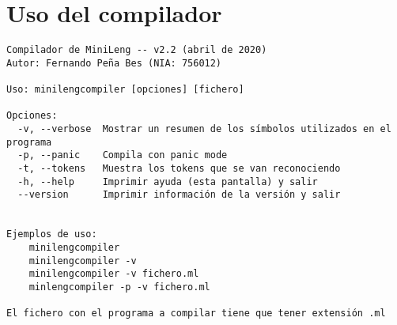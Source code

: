 \documentclass[../main.tex]{subfiles}
\begin{document}
\section{Uso del compilador}

\begin{verbatim}
Compilador de MiniLeng -- v2.2 (abril de 2020)
Autor: Fernando Peña Bes (NIA: 756012)

Uso: minilengcompiler [opciones] [fichero]

Opciones:
  -v, --verbose  Mostrar un resumen de los símbolos utilizados en el programa
  -p, --panic	 Compila con panic mode
  -t, --tokens   Muestra los tokens que se van reconociendo
  -h, --help	 Imprimir ayuda (esta pantalla) y salir
  --version      Imprimir información de la versión y salir


Ejemplos de uso:
    minilengcompiler
    minilengcompiler -v
    minilengcompiler -v fichero.ml
    minlengcompiler -p -v fichero.ml

El fichero con el programa a compilar tiene que tener extensión .ml
\end{verbatim}
\end{document}

